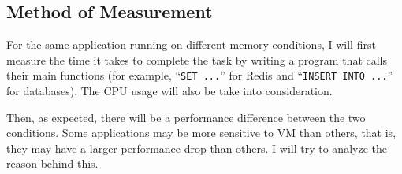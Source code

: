 \documentclass{article}
\begin{document}
\subsection{Method of Measurement}

For the same application running on different memory conditions, I will first measure the time it takes to complete the task by writing a program that calls their main functions (for example, ``\texttt{SET ...}'' for Redis and ``\texttt{INSERT INTO ...}'' for databases). The CPU usage will also be take into consideration.

Then, as expected, there will be a performance difference between the two conditions. Some applications may be more sensitive to VM than others, that is, they may have a larger performance drop than others. I will try to analyze the reason behind this.




\end{document}
